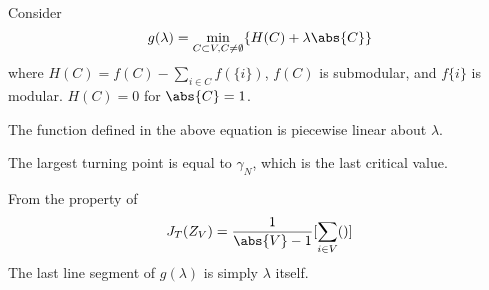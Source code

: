Consider
\begin{equation}
g(\lambda) = \min_{C\subset V, C\neq \emptyset} \{ H(C) + \lambda\abs{C}\}
\end{equation}
where $H(C) = f(C) - \sum_{i\in C} f(\{i\})$, $f(C)$ is submodular, and $f\{i\}$ is modular.
$H(C)=0$ for $\abs{C}=1$.

The function defined in the above equation is piecewise linear about $\lambda$.

The largest turning point is equal to $\gamma_N$, which is the last critical value.

From the property of 
\begin{equation}
J_T(Z_V) = \frac{1}{\abs{V}-1} [\sum_{i \in V}()]
\end{equation}
The last line segment of $g(\lambda)$ is simply $\lambda$ itself.